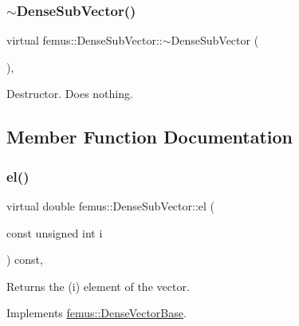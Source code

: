 \subsubsection{\texorpdfstring{$\sim$\+Dense\+Sub\+Vector()}{~DenseSubVector()}}
{\footnotesize\ttfamily virtual femus\+::\+Dense\+Sub\+Vector\+::$\sim$\+Dense\+Sub\+Vector (\begin{DoxyParamCaption}{ }\end{DoxyParamCaption})\hspace{0.3cm}{\ttfamily [inline]}, {\ttfamily [virtual]}}



Destructor. Does nothing. 



\subsection{Member Function Documentation}
\mbox{\label{classfemus_1_1_dense_sub_vector_a7e95ed027b438413f00d790ff5c95fb2}} 
\subsubsection{\texorpdfstring{el()}{el()}\hspace{0.1cm}{\footnotesize\ttfamily [1/2]}}
{\footnotesize\ttfamily virtual double femus\+::\+Dense\+Sub\+Vector\+::el (\begin{DoxyParamCaption}\item[{const unsigned int}]{i }\end{DoxyParamCaption}) const\hspace{0.3cm}{\ttfamily [inline]}, {\ttfamily [virtual]}}

\begin{DoxyReturn}{Returns}
the {\ttfamily }(i) element of the vector. 
\end{DoxyReturn}


Implements \mbox{\hyperlink{classfemus_1_1_dense_vector_base_ae2a833cdebb39552185cb66b139758e8}{femus\+::\+Dense\+Vector\+Base}}.

\mbox{\label{classfemus_1_1_dense_sub_vector_a5cb51e53b54d085933d2ebe6f762ecd1}} 

